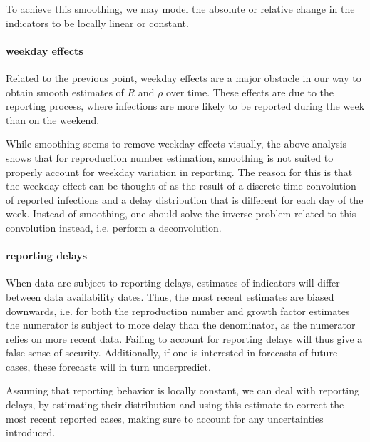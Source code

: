 To achieve this smoothing, we may model the absolute or relative change in the indicators to be locally linear or constant. 

\paragraph{weekday effects}
Related to the previous point, weekday effects are a major obstacle in our way to obtain smooth estimates of $R$ and $\rho$ over time. These effects are due to the reporting process, where infections are more likely to be reported during the week than on the weekend. 

While smoothing seems to remove weekday effects visually, the above analysis shows that for reproduction number estimation, smoothing is not suited to properly account for weekday variation in reporting. The reason for this is that the weekday effect can be thought of as the result of a discrete-time convolution of reported infections and a delay distribution that is different for each day of the week. Instead of smoothing, one should solve the inverse problem related to this convolution instead, i.e. perform a deconvolution. 

\paragraph{reporting delays}
When data are subject to reporting delays, estimates of indicators will differ between data availability dates. Thus, the most recent estimates are biased downwards, i.e. for both the reproduction number and growth factor estimates the numerator is subject to more delay than the denominator, as the numerator relies on more recent data. Failing to account for reporting delays will thus give a false sense of security. Additionally, if one is interested in forecasts of future cases, these forecasts will in turn underpredict. 

Assuming that reporting behavior is locally constant, we can deal with reporting delays, by estimating their distribution and using this estimate to correct the most recent reported cases, making sure to account for any uncertainties introduced. 

